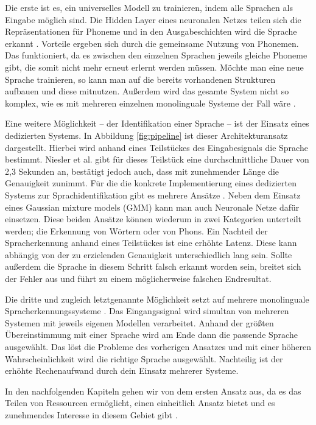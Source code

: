 Die erste ist es, ein universelles Modell zu trainieren, indem alle Sprachen als Eingabe möglich sind. Die Hidden Layer eines neuronalen Netzes teilen sich die Repräsentationen für Phoneme und in den Ausgabeschichten wird die Sprache erkannt \cite{Yu.2014}.
Vorteile ergeben sich durch die gemeinsame Nutzung von Phonemen. Das funktioniert, da es zwischen den einzelnen Sprachen jeweils gleiche Phoneme gibt, die somit nicht mehr erneut erlernt werden müssen.
Möchte man eine neue Sprache trainieren, so kann man auf die bereits vorhandenen Strukturen aufbauen und diese mitnutzen.
Außerdem wird das gesamte System nicht so komplex, wie es mit mehreren einzelnen monolinguale Systeme der Fall wäre \cite{Bartz.2017}.

Eine weitere Möglichkeit – der Identifikation einer Sprache – ist der Einsatz eines dedizierten Systems. In Abbildung \ref{fig:pipeline} ist dieser Architekturansatz
dargestellt. Hierbei wird anhand eines Teilstückes des Eingabesignals die Sprache bestimmt. Niesler et al. \cite{Niesler.2006} gibt für dieses Teilstück eine durchschnittliche Dauer von 2,3 Sekunden an,
bestätigt jedoch auch, dass mit zunehmender Länge die Genauigkeit zunimmt.
Für die die konkrete Implementierung eines dedizierten Systems zur Sprachidentifikation gibt es mehrere Ansätze \cite{Niesler.2006}. Neben dem Einsatz eines Gaussian mixture models (GMM) kann man auch Neuronale Netze dafür einsetzen.
Diese beiden Ansätze können wiederum in zwei Kategorien unterteilt werden; die Erkennung von Wörtern oder von Phons.
Ein Nachteil der Spracherkennung anhand eines Teilstückes ist eine erhöhte Latenz. Diese kann abhängig von der zu erzielenden Genauigkeit unterschiedlich lang sein.
Sollte außerdem die Sprache in diesem Schritt falsch erkannt worden sein,
breitet sich der Fehler aus und führt zu einem möglicherweise falschen Endresultat.

Die dritte und zugleich letztgenannte Möglichkeit setzt auf mehrere monolinguale Spracherkennungssysteme \cite{Gonzalez.2015}.
Das Eingangssignal wird simultan von mehreren Systemen mit jeweils eigenen Modellen verarbeitet.
Anhand der größten Übereinstimmung mit einer Sprache wird am Ende dann die passende Sprache ausgewählt.
Das löst die Probleme des vorherigen Ansatzes und mit einer höheren Wahrscheinlichkeit wird die richtige Sprache ausgewählt.
Nachteilig ist der erhöhte Rechenaufwand durch dein Einsatz mehrerer Systeme.

In den nachfolgenden Kapiteln gehen wir von dem ersten Ansatz aus, da es das Teilen von Ressourcen ermöglicht, einen einheitlich Ansatz bietet
und es zunehmendes Interesse in diesem Gebiet gibt \cite{Yu.2014, Hara.2017}.